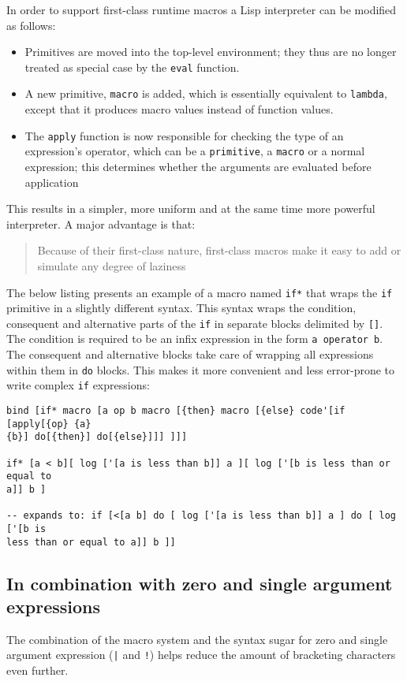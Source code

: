 In order to support first-class runtime macros a Lisp interpreter can be
modified as follows\cite{macros}:
\begin{itemize}
    \item Primitives are moved into the top-level environment; they thus are
    no longer treated as special case by the \texttt{eval} function.
    \item A new primitive, \texttt{macro} is added, which is essentially
    equivalent to \texttt{lambda}, except that it produces macro values
    instead of function values.
    \item The \texttt{apply} function is now responsible for checking the
    type of an expression's operator, which can be a \texttt{primitive}, a
    \texttt{macro} or a normal expression; this determines whether the
    arguments are evaluated before application
\end{itemize}

This results in a simpler, more uniform and at the same time more powerful
interpreter. A major advantage is that:
\begin{quote}
    Because of their first-class nature, first-class macros make it easy to add or
    simulate any degree of laziness\cite{macros}
\end{quote}

The below listing presents an example of a macro named \texttt{if*} that wraps
the \texttt{if} primitive in a slightly different syntax. This syntax wraps the
condition, consequent and alternative parts of the \texttt{if} in separate
blocks delimited by \texttt{[]}. The condition is required to be an infix
expression in the form \texttt{a operator b}. The consequent and alternative
blocks take care of wrapping all expressions within them in \texttt{do}
blocks. This makes it more convenient and less error-prone to write complex
\texttt{if} expressions:
\begin{lstlisting}
bind [if* macro [a op b macro [{then} macro [{else} code'[if [apply[{op} {a}
{b}] do[{then}] do[{else}]]] ]]]

if* [a < b][ log ['[a is less than b]] a ][ log ['[b is less than or equal to
a]] b ]

-- expands to: if [<[a b] do [ log ['[a is less than b]] a ] do [ log ['[b is
less than or equal to a]] b ]]
\end{lstlisting}



\subsection{In combination with zero and single argument expressions}\label{subsub:macros}
The combination of the macro system and the syntax sugar for zero and single argument expression (\texttt{|} and \texttt{!}) helps reduce the amount of bracketing characters even further.

